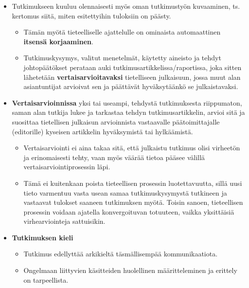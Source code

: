 \documentclass[
]{book}
\providecommand{\tightlist}{%
  \setlength{\itemsep}{0pt}\setlength{\parskip}{0pt}}
\begin{document}
\hfill\break
\hfill\break

\begin{itemize}
\tightlist
\item
  Tutkimukseen kuuluu olennaisesti myös oman tutkimustyön kuvaaminen, ts. kertomus siitä, miten esitettyihin tuloksiin on päästy.

  \begin{itemize}
  \tightlist
  \item
    Tämän myötä tieteelliselle ajattelulle on ominaista automaattinen \textbf{itsensä korjaaminen}.
  \item
    Tutkimuskysymys, valitut menetelmät, käytetty aineisto ja tehdyt johtopäätökset perataan auki tutkimusartikkelissa/raportissa, joka sitten lähetetään \textbf{vertaisarvioitavaksi} tietelliseen julkaisuun, jossa muut alan asiantuntijat arvioivat sen ja päättävät hyväksytäänkö se julkaistavaksi.
  \end{itemize}
\item
  \textbf{Vertaisarvioinnissa} yksi tai useampi, tehdystä tutkimuksesta riippumaton, saman alan tutkija lukee ja tarkastaa tehdyn tutkimusartikkelin, arvioi sitä ja suosittaa tietellisen julkaisun arvioinnista vastaavalle päätoimittajalle (editorille) kyseisen artikkelin hyväksymistä tai hylkäämistä.

  \begin{itemize}
  \tightlist
  \item
    Vertaisarviointi ei aina takaa sitä, että julkaistu tutkimus olisi virheetön ja erinomaisesti tehty, vaan myös väärää tietoa pääsee välillä vertaisarviointiprosessin läpi.
  \item
    Tämä ei kuitenkaan poista tieteellisen prosessin luotettavuutta, sillä uusi tieto varmentuu vasta usean samaa tutkimuskysymystä tutkineen ja vastaavat tulokset saaneen tutkimuksen myötä. Toisin sanoen, tieteellisen prosessin voidaan ajatella konvergoituvan totuuteen, vaikka yksittäisiä virhearviointeja sattuisikin.\\
  \end{itemize}
\item
  \textbf{Tutkimuksen kieli}

  \begin{itemize}
  \tightlist
  \item
    Tutkimus edellyttää arkikieltä täsmällisempää kommunikaatiota.
  \item
    Ongelmaan liittyvien käsitteiden huolellinen määritteleminen ja erittely on tarpeellista.


\end{itemize}
\end{itemize}
\end{document}
